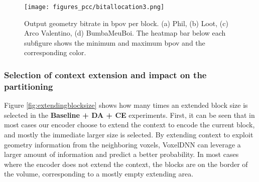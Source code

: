 \begin{figure*}[tb]
\captionsetup{justification=raggedright}
\centering
\texttt{[image: figures\_pcc/bitallocation3.png]}
\caption{Output geometry bitrate in bpov per block. (a) Phil, (b) Loot, (c) Arco Valentino, (d) BumbaMeuBoi. The heatmap bar below each subfigure shows the minimum and maximum bpov and the corresponding color. }
\label{fig:bitallocation}
\end{figure*}
\vspace{15mm}


\subsubsection{Selection of context extension and impact on the partitioning}
Figure \ref{fig:extendingblocksize} shows how many times an extended block size is selected in the \textbf{Baseline + DA + CE} experiments. First, it can be seen that in most  cases our encoder choose to extend the context to encode the current block, and mostly the immediate larger size is selected. By extending context to exploit geometry information from the neighboring voxels, VoxelDNN can leverage a larger amount of information and predict a better probability. In most  cases where the encoder does not extend the context, the blocks are on the border of the volume, corresponding to a mostly empty  extending area.

